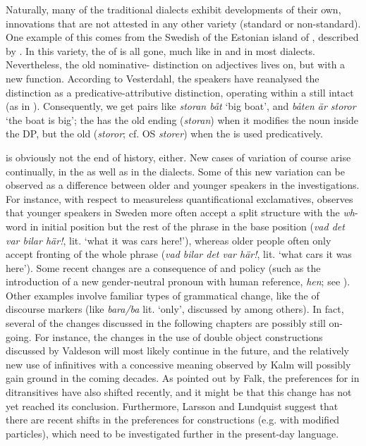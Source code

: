 \documentclass[output=paper]{langscibook}
\begin{document}
Naturally, many of the traditional dialects exhibit developments of their own, innovations that are not attested in any other variety (standard or non-standard). One example of this comes from the Swedish  of the Estonian island of , described by \citet{Vesterdahl2018}. In this variety, the  of  is all gone, much like in  and in most dialects. Nevertheless, the old nominative- distinction on adjectives lives on, but with a new function. According to Vesterdahl, the  speakers have reanalysed the distinction as a predicative-attributive distinction, operating within a still intact  (as in ). Consequently, we get pairs like \textit{storan båt} ‘big boat’, and \textit{båten är storor} ‘the boat is big’; the  has the old   ending (\textit{storan}) when it modifies the noun inside the DP, but the old   (\textit{storor}; cf. OS \textit{storer}) when the  is used predicatively.



 is obviously not the end of history, either. New cases of variation of course arise continually, in the  as well as in the dialects. Some of this new variation can be observed as a difference between older and younger speakers in the  investigations. For instance, with respect to measureless quantificational exclamatives, \citet{Vangsnes2014} observes that younger speakers in Sweden more often accept a split structure with the \textit{wh}{}-word in initial position but the rest of the phrase in the base position (\textit{vad det var bilar här!}, lit. ‘what it was cars here!’), whereas older people often only accept fronting of the whole phrase (\textit{vad bilar det var här!}, lit. ‘what cars it was here’). Some recent changes are a consequence of  and policy (such as the introduction of a new gender-neutral pronoun with human reference, \textit{hen}; see \citealt{LedinLyngfelt2013}). Other examples involve familiar types of grammatical change, like the  of discourse markers (like \textit{bara/ba} lit. ‘only’, discussed by \citealt{Eriksson1995} among others). In fact, several of the changes discussed in the following chapters are possibly still on-going. For instance, the changes in the use of double object constructions discussed by Valdeson will most likely continue in the future, and the relatively new use of  infinitives with a concessive meaning observed by Kalm will possibly gain ground in the coming decades. As pointed out by Falk, the preferences for  in ditransitives have also shifted recently, and it might be that this change has not yet reached its conclusion. Furthermore, Larsson and Lundquist suggest that there are recent shifts in the preferences for  constructions (e.g. with modified particles), which need to be investigated further in the present-day language.
\end{document}
